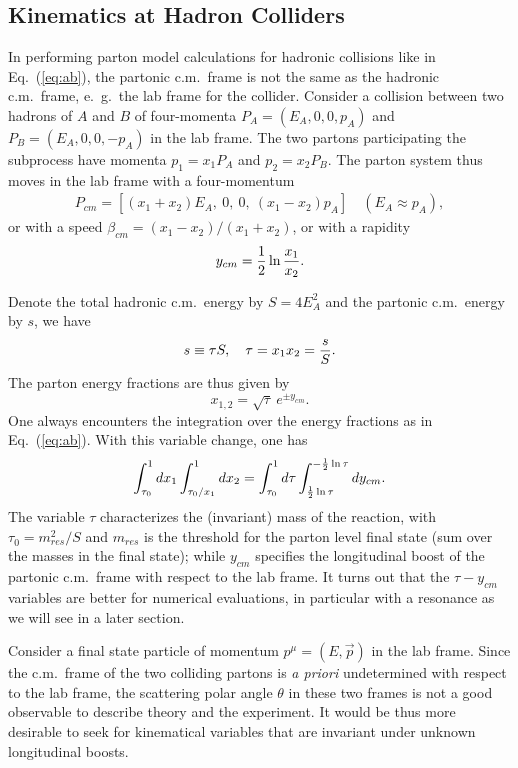 \documentclass[12pt,prd,aps,floats,preprintnumbers,preprint,superscriptaddress,floatfix,nofootinbib]{revtex4}
\def\be{\begin{equation}}
\def\ee{\end{equation}}
\def\bea{\begin{eqnarray}}
\def\eea{\end{eqnarray}}
\begin{document}
\subsection{Kinematics at Hadron Colliders}

In performing parton model calculations for hadronic collisions like in 
Eq.~(\ref{eq:ab}), the partonic c.m.~frame is not the same as the hadronic
c.m.~frame, {e.~g.}~the lab frame for the collider. 
Consider a collision between two hadrons of $A$ and $B$
of four-momenta $P_A=(E_A^{},0,0,p_A^{})$ and $P_B=(E_A^{},0,0,-p_A^{})$ 
in the lab frame. The two partons participating 
the subprocess have momenta $p_1=x_1 P_A^{}$ and $p_2=x_2 P_B^{}$.
The parton system thus moves in the lab frame with a four-momentum 
\bea
P_{cm}=[(x_1+x_2)E_A^{},\ 0,\ 0,\  (x_1-x_2)p_A^{} ] \quad (E_A\approx p_A^{}) ,
\eea
or with a speed $\beta_{cm} = (x_1-x_2) / (x_1+x_2)$, or with a rapidity 
\be
y_{cm} = {1\over 2} \ln {x_1 \over x_2}.
\label{eq:rapcm}
\ee

Denote the total hadronic c.m.~energy by $S=4E_A^2$ and the partonic c.m.~energy
by $s$, we have
\be
s \equiv \tau S,\quad \tau = x_1 x_2 = {s\over S}.
\ee
The parton energy fractions are thus given by
\be
x_{1,2}^{} = \sqrt\tau\ e^{\pm y^{}_{cm}}.
\ee
One always encounters the integration over the energy fractions
as in Eq.~(\ref{eq:ab}). With this variable change, one has
\be
\int_{\tau_0}^1 dx_1 \int_{\tau_0/x_1}^1 dx_2 = \int_{\tau_0}^1 d\tau
 \int_{{1\over 2}\ln\tau}^{-{1\over 2}\ln\tau} dy_{cm}.
\ee
The variable $\tau$ characterizes the (invariant) mass of the reaction, 
with $\tau^{}_0=m^2_{res}/S$ and $m_{res}$ is the threshold for the parton level
final state (sum over the masses in the final state); while $y_{cm}$ specifies the
longitudinal boost of the partonic c.m.~frame with respect to the lab frame.
It turns out that the $\tau - y_{cm}$ variables are
better for numerical evaluations, in particular with a resonance as we will
see in a later section.

Consider a final state particle of momentum $p^\mu = (E,\vec p)$
in the lab frame. 
Since the c.m.~frame of the two colliding partons is {\it a priori} 
undetermined with respect to the lab frame, 
the scattering polar angle  $\theta$ in these two frames is not
a good observable to describe theory and the experiment.
It would be thus more desirable to seek for kinematical variables
that are invariant under unknown longitudinal boosts.
\end{document}
